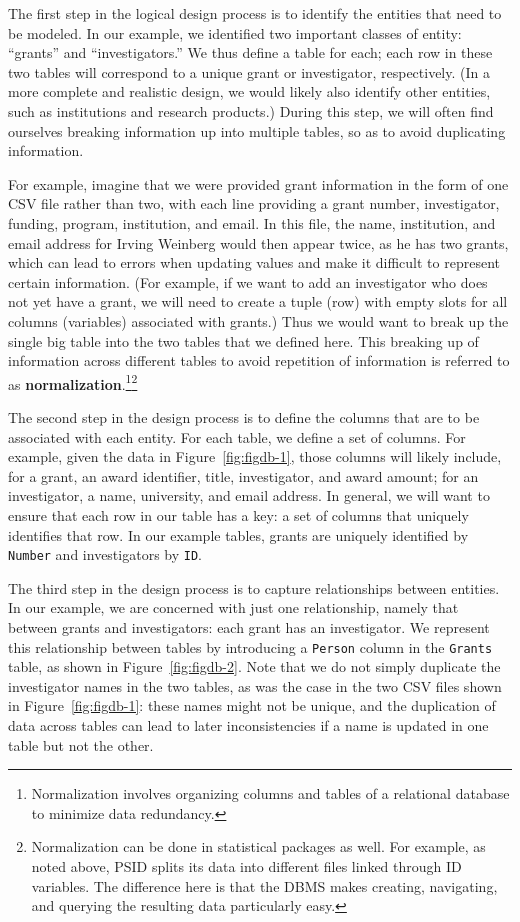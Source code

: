 \documentclass[]{krantz}
\begin{document}
The first step in the logical design process is to identify the entities
that need to be modeled. In our example, we identified two important
classes of entity: ``grants'' and ``investigators.'' We thus define a
table for each; each row in these two tables will correspond to a unique
grant or investigator, respectively. (In a more complete and realistic
design, we would likely also identify other entities, such as
institutions and research products.) During this step, we will often
find ourselves breaking information up into multiple tables, so as to
avoid duplicating information.

For example, imagine that we were provided grant information in the form
of one CSV file rather than two, with each line providing a grant
number, investigator, funding, program, institution, and email. In this
file, the name, institution, and email address for Irving Weinberg would
then appear twice, as he has two grants, which can lead to errors when
updating values and make it difficult to represent certain information.
(For example, if we want to add an investigator who does not yet have a
grant, we will need to create a tuple (row) with empty slots for all
columns (variables) associated with grants.) Thus we would want to break
up the single big table into the two tables that we defined here. This
breaking up of information across different tables to avoid repetition
of information is referred to as \textbf{normalization}.\footnote{Normalization
  involves organizing columns and tables of a relational database to
  minimize data redundancy.}\footnote{Normalization can be done in
  statistical packages as well. For example, as noted above, PSID splits
  its data into different files linked through ID variables. The
  difference here is that the DBMS makes creating, navigating, and
  querying the resulting data particularly easy.}

The second step in the design process is to define the columns that are
to be associated with each entity. For each table, we define a set of
columns. For example, given the data in Figure~\ref{fig:figdb-1}, those
columns will likely include, for a grant, an award identifier, title,
investigator, and award amount; for an investigator, a name, university,
and email address. In general, we will want to ensure that each row in
our table has a key: a set of columns that uniquely identifies that row.
In our example tables, grants are uniquely identified by \texttt{Number}
and investigators by \texttt{ID}.

The third step in the design process is to capture relationships between
entities. In our example, we are concerned with just one relationship,
namely that between grants and investigators: each grant has an
investigator. We represent this relationship between tables by
introducing a \texttt{Person} column in the \texttt{Grants} table, as
shown in Figure~\ref{fig:figdb-2}. Note that we do not simply duplicate
the investigator names in the two tables, as was the case in the two CSV
files shown in Figure~\ref{fig:figdb-1}: these names might not be
unique, and the duplication of data across tables can lead to later
inconsistencies if a name is updated in one table but not the other.
\end{document}
